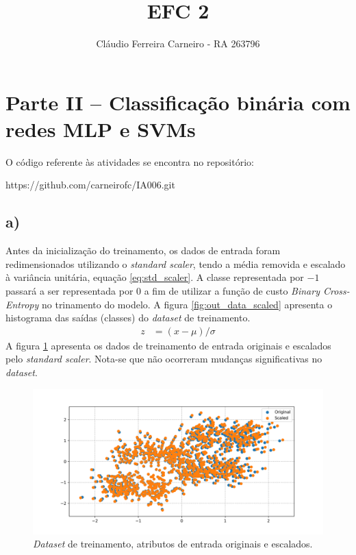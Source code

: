\documentclass{article}
\author{Cláudio Ferreira Carneiro - RA 263796}
\title{EFC 2}
\begin{document}
    \maketitle
    \newpage
    \section[]{Parte II – Classificação binária com redes MLP e SVMs}
    O código referente às atividades se encontra no repositório:
    
    https://github.com/carneirofc/IA006.git\linebreak
    \subsection*{a)} Antes da inicialização do treinamento,
    os dados de entrada foram redimensionados utilizando o \textit{standard scaler},
    tendo a média removida e escalado à variância unitária, equação \ref{eq:std_scaler}.
    A classe representada por $-1$ passará a ser representada por $0$ a fim de utilizar a
    função de custo \textit{Binary Cross-Entropy} no trinamento do modelo. A figura \ref{fig:out_data_scaled}
    apresenta o histograma das saídas (classes) do \textit{dataset} de treinamento.
    \begin{align}
        z &= (x - \mu) / \sigma
        \label{eq:std_scaler}
    \end{align}
    A figura \ref{fig:inp_data_scaled} apresenta os dados de treinamento de entrada originais e 
    escalados pelo \textit{standard scaler}. Nota-se que não ocorreram mudanças significativas
    no \textit{dataset}.
    \begin{figure}[H]
        \centering
        \includegraphics[width=\linewidth]{mlp_inp_scaled.png}   
        \caption{\textit{Dataset} de treinamento, atributos de entrada
            originais e escalados.}
        \label{fig:inp_data_scaled}
    \end{figure}
    
\end{document}
